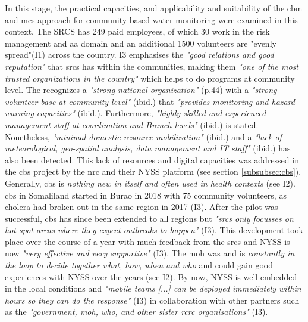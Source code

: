 In this stage, the practical capacities, and applicability and suitability of the \acrshort{cbm} and \acrshort{mcs} approach for community-based water monitoring were examined in this context. The SRCS has 249 paid employees, of which 30 work in the risk management and \acrlong{aa} domain and an additional 1500 volunteers are "evenly spread"(I1) across the country. I3 emphasises the \textit{"good relations and good reputation"} that \acrshort{srcs} has within the communities, making them \textit{"one of the most trusted organizations in the country"} which helps to do programs at community level. The  \autocite{scrsFeasibilityStudyPotential2022} recognizes a \textit{"strong national organization"} (p.44) with a \textit{"strong volunteer base at community level"} (ibid.) that \textit{"provides monitoring and hazard warning capacities"} (ibid.). Furthermore, \textit{"highly skilled and experienced management staff at coordination and Branch levels"} (ibid.) is stated. Nonetheless, \textit{"minimal domestic resource mobilization"} (ibid.) and a \textit{"lack of meteorological, geo-spatial analysis, data management and IT staff"} (ibid.) has also been detected.\newline
This lack of resources and digital capacities was addressed in the \acrshort{cbs} project by the \acrshort{nrc} and their NYSS platform (see section \ref{subsubsec:cbs}). Generally, \acrshort{cbs} is \textit{nothing new in itself and often used in health contexts} (see I2). \acrshort{cbs} in Somaliland started in Burao in 2018 with 75 community volunteers, as cholera had broken out in the same region in 2017 (I3). After the pilot was successful, \acrshort{cbs} has since been extended to all regions but \textit{"\acrshort{srcs} only focusses on hot spot areas where they expect outbreaks to happen"} (I3). This development took place over the course of a year with much feedback from the \acrshort{srcs} and NYSS is now \textit{"very effective and very supportive"} (I3). The \acrfull{moh} was and is \textit{constantly in the loop to decide together what, how, when and who} and could gain good experiences with NYSS over the years (see I2). By now, NYSS is well embedded in the local conditions and \textit{"mobile teams [...] can be deployed immediately within hours so they can do the response"} (I3) in collaboration with other partners such as the \textit{"government, \acrshort{moh}, \acrshort{who}, and other sister \acrshort{rcrc} organisations"} (I3).\newline
